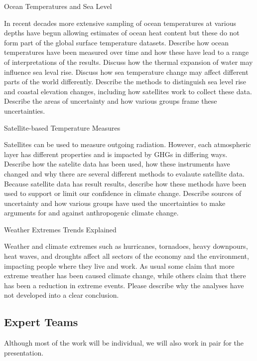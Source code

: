\documentclass{article}\usepackage[]{graphicx}\usepackage[]{color}
\newenvironment{enumerate*}%
  {\begin{enumerate}%
    \setlength{\itemsep}{0pt}%
    \setlength{\parskip}{0pt}}%
  {\end{enumerate}}
\begin{document}
\begin{enumerate*}
  \item Ocean Temperatures and Sea Level

In recent decades more extensive sampling of ocean temperatures at various depths have begun allowing estimates of ocean heat content but these do not form part of the global surface temperature datasets. Describe how ocean temperatures have been measured over time and how these have lead to a range of interpretations of the results. Discuss how the thermal expansion of water may influence sea leval rise. Discuss how sea temperature change may affect different parts of the world differently. Describe the methods to distinguish sea level rise and coastal elevation changes, including how satellites work to collect these data. Describe the areas of uncertainty and how various groups frame these uncertainties.

  \item Satellite-based Temperature Measures
  
Satellites can be used to measure outgoing radiation. However, each atmospheric layer has different properties and is impacted by GHGs in differing ways. Describe how the satelite data has been used, how these instruments have changed and why there are several different methods to evalaute satellite data. Because satellite data has result results, describe how these methods have been used to support or limit our confidence in climate change. Describe sources of uncertainty and how various groups have used the uncertainties to make arguments for and against anthropogenic climate change.
  
  \item Weather Extremes Trends Explained
  
Weather and climate extremes such as hurricanes, tornadoes, heavy downpours, heat waves, and droughts affect all sectors of the economy and the environment, impacting people where they live and work. As usual some claim that more extreme weather has been caused climate change, while others claim that there has been a reduction in extreme events. Please describe why the analyses have not developed into a clear conclusion. 
  
\end{enumerate*}

\subsection{Expert Teams}

Although most of the work will be individual, we will also work in pair for the presentation. 
\end{document}
